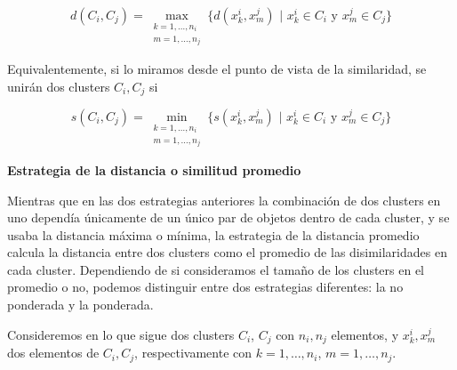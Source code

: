 \[
d(C_{i},C_{j}) = \max_{\substack{k=1,\dots,n_{i} \\ m=1,\dots,n_{j}}}\{d(x^{i}_{k},x^{j}_{m}) \text{ | } x^{i}_{k} \in C_{i} \text{ y } x^{j}_{m} \in C_{j}\}
\]

Equivalentemente, si lo miramos desde el punto de vista de la similaridad, se unirán dos clusters $C_{i}, C_{j}$ si

\[
s(C_{i},C_{j}) = \min_{\substack{k=1,\dots,n_{i} \\ m=1,\dots,n_{j}}}\{s(x^{i}_{k},x^{j}_{m}) \text{ | } x^{i}_{k} \in C_{i} \text{ y } x^{j}_{m} \in C_{j}\}
\]

\textbf{Estrategia de la distancia o similitud promedio}

Mientras que en las dos estrategias anteriores la combinación de dos clusters en uno dependía únicamente de un único par de objetos dentro de cada cluster, 
y se usaba la distancia máxima o mínima, la estrategia de la distancia promedio calcula la distancia entre dos clusters como el promedio de las disimilaridades 
en cada cluster. Dependiendo de si consideramos el tamaño de los clusters en el promedio o no, podemos distinguir entre dos estrategias diferentes: la no ponderada
y la ponderada. \newline

Consideremos en lo que sigue dos clusters $C_{i}$, $C_{j}$ con $n_{i},n_{j}$ elementos, y $x^{i}_{k},x^{j}_{m}$ dos elementos de $C_{i},C_{j}$, respectivamente con $k=1,\dots,n_{i}$, $m=1,\dots,n_{j}$.

